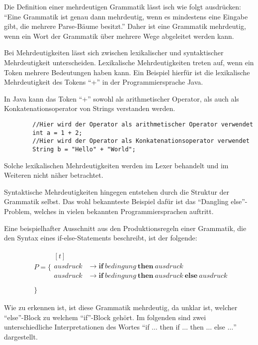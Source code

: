 \documentclass[runningheads]{llncs}
\begin{document}
	Die Definition einer mehrdeutigen Grammatik lässt isch wie folgt ausdrücken:
	``Eine Grammatik ist genau dann mehrdeutig, wenn es mindestens eine Eingabe gibt, die mehrere Parse-Bäume besitzt.''
	Daher ist eine Grammatik mehrdeutig, wenn ein Wort der Grammatik über mehrere Wege abgeleitet werden kann.

	Bei Mehrdeutigkeiten lässt sich zwischen lexikalischer und syntaktischer Mehrdeutigkeit unterscheiden.
	Lexikalische Mehrdeutigkeiten treten auf, wenn ein Token mehrere Bedeutungen haben kann.
	Ein Beispiel hierfür ist die lexikalische Mehrdeutigkeit des Tokens ``+'' in der Programmiersprache Java.

	In Java kann das Token ``+'' sowohl als arithmetischer Operator,
	als auch als Konkatenationsoperator von Strings verstanden werden.

	\begin{verbatim}
		//Hier wird der Operator als arithmetischer Operator verwendet
		int a = 1 + 2;
		//Hier wird der Operator als Konkatenationsoperator verwendet
		String b = "Hello" + "World";
	\end{verbatim}

	Solche lexikalischen Mehrdeutigkeiten werden im Lexer behandelt und im Weiteren nicht näher betrachtet.

	Syntaktische Mehrdeutigkeiten hingegen entstehen durch die Struktur der Grammatik selbst.
	Das wohl bekannteste Beispiel dafür ist das ``Dangling else''-Problem,
	welches in vielen bekannten Programmiersprachen auftritt.

	Eine beispielhafter Ausschnitt aus den Produktionsregeln einer Grammatik, die den Syntax eines if-else-Statements beschreibt,
	ist der folgende:


	\begin{align*}
		& P = \{ \begin{aligned}[t]
			         \\
			         ausdruck & \rightarrow \textbf{if} \ bedingung \ \textbf{then} \ ausdruck \\
			         ausdruck & \rightarrow \textbf{if} \ bedingung \ \textbf{then} \ ausdruck \ \textbf{else} \ ausdruck \\
		\end{aligned} \\
		& \}
	\end{align*}

	Wie zu erkennen ist, ist diese Grammatik mehrdeutig, da unklar ist,
	welcher ``else''-Block zu welchem ``if''-Block gehört.
	Im folgenden sind zwei unterschiedliche Interpretationen des Wortes
	``if $\dots$ then if $\dots$ then $\dots$ else $\dots$'' dargestellt.
\end{document}
